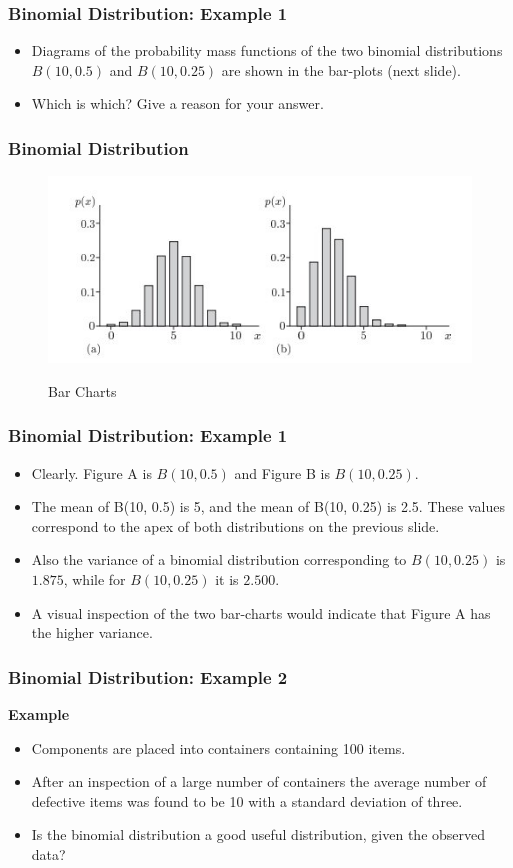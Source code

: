 \frametitle{Binomial Distribution: Example 1}
\begin{itemize} \item Diagrams of the probability mass functions of the two binomial
distributions $B(10, 0.5)$ and $B(10, 0.25)$ are shown in the bar-plots (next slide). \item Which
is which? Give a reason for your answer.
\end{itemize}
\smallskip 

\frametitle{Binomial Distribution}
\begin{figure}
  \includegraphics[scale=0.60]{4ABarCharts.jpg}\\
  \caption{Bar Charts}
\end{figure}
\smallskip 

\frametitle{Binomial Distribution: Example 1}
\begin{itemize}
\item Clearly. Figure A is $B(10, 0.5)$ and Figure B is $B(10, 0.25)$.
\item The mean of B(10, 0.5) is 5, and the mean of B(10, 0.25) is 2.5. These values correspond to the apex of both distributions on the previous slide.
\item Also the variance of a binomial distribution corresponding to $B(10, 0.25)$ is $1.875$, while for $B(10, 0.25)$ it is $2.500$.
\item A visual inspection of the two bar-charts would indicate that Figure A has the higher variance.
\end{itemize}
\smallskip 

\frametitle{Binomial Distribution: Example 2}
\textbf{Example}
\begin{itemize}
\item Components are placed into containers containing 100 items.
\item After an inspection of a large number of containers the average number of defective items was found to be 10 with a standard deviation of three.
\item Is the binomial distribution a good useful distribution, given the observed data?
\end{itemize}
\smallskip 

